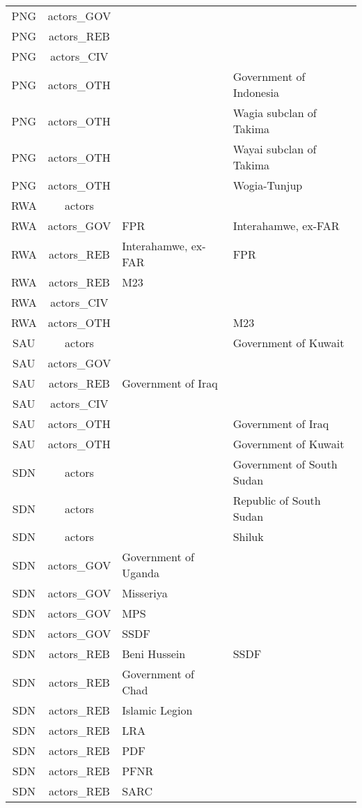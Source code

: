 \documentclass[12pt]{article}
\begin{document}
\begin{center}
\begin{longtable}{|c|c|p{7cm}|p{7cm}|}
  PNG & actors\_GOV &  &  \\ 
  PNG & actors\_REB &  &  \\ 
  PNG & actors\_CIV &  &  \\ 
  PNG & actors\_OTH &  & Government of Indonesia \\ 
  PNG & actors\_OTH &  & Wagia subclan of Takima \\ 
  PNG & actors\_OTH &  & Wayai subclan of Takima \\ 
  PNG & actors\_OTH &  & Wogia-Tunjup \\ 
  RWA & actors &  &  \\ 
  RWA & actors\_GOV & FPR & Interahamwe, ex-FAR \\ 
  RWA & actors\_REB & Interahamwe, ex-FAR & FPR \\ 
  RWA & actors\_REB & M23 &  \\ 
  RWA & actors\_CIV &  &  \\ 
  RWA & actors\_OTH &  & M23 \\ 
  SAU & actors &  & Government of Kuwait \\ 
  SAU & actors\_GOV &  &  \\ 
  SAU & actors\_REB & Government of Iraq &  \\ 
  SAU & actors\_CIV &  &  \\ 
  SAU & actors\_OTH &  & Government of Iraq \\ 
  SAU & actors\_OTH &  & Government of Kuwait \\ 
  SDN & actors &  & Government of South Sudan \\ 
  SDN & actors &  & Republic of South Sudan \\ 
  SDN & actors &  & Shiluk \\ 
  SDN & actors\_GOV & Government of Uganda &  \\ 
  SDN & actors\_GOV & Misseriya &  \\ 
  SDN & actors\_GOV & MPS &  \\ 
  SDN & actors\_GOV & SSDF &  \\ 
  SDN & actors\_REB & Beni Hussein & SSDF \\ 
  SDN & actors\_REB & Government of Chad &  \\ 
  SDN & actors\_REB & Islamic Legion &  \\ 
  SDN & actors\_REB & LRA &  \\ 
  SDN & actors\_REB & PDF &  \\ 
  SDN & actors\_REB & PFNR &  \\ 
  SDN & actors\_REB & SARC &  \\ 

\end{longtable}
\end{center}
\end{document}
